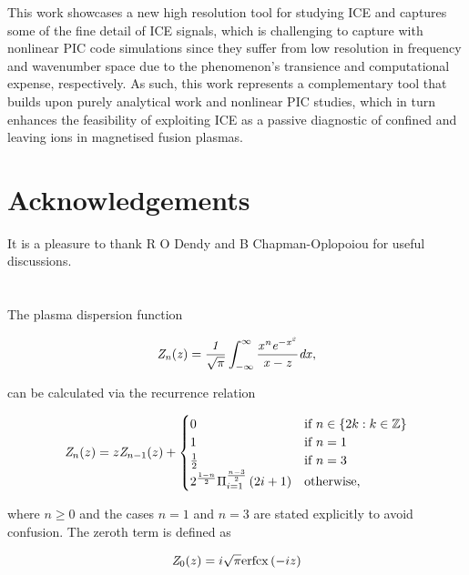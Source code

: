 \documentclass[12pt]{iopart}
\begin{document}
This work showcases a new high resolution tool for studying ICE and captures
some of the fine detail of ICE signals, which is challenging to capture
with nonlinear PIC
code simulations since they suffer from low resolution in frequency and
wavenumber space due to the phenomenon's transience and computational expense,
respectively. As such, this work represents a complementary tool that builds
upon purely analytical work and nonlinear PIC studies, which in turn enhances
the feasibility of exploiting ICE as a passive diagnostic of confined and
leaving ions in magnetised fusion plasmas.

\section{Acknowledgements}

It is a pleasure to thank R O Dendy and B Chapman-Oplopoiou for useful
discussions.

\appendix

\section{}

The plasma dispersion function\cite{Fried1961}

\begin{equation}
\it{Z}_n(z)=\frac{1}{\sqrt{\pi}}\int_{-\infty}^{\infty}\frac{x^n e^{-x^2}}{x-z}dx,
\end{equation}

\noindent can be calculated via the recurrence relation\cite{Sampoorna2007}

\begin{equation}
{\it Z}_n(z) = z {\it Z}_{n-1}(z) + \begin{cases}
0 & \text{if } n \in \{2k : k \in \mathbb{Z}\}
\\
1 & \text{if } n = 1
\\
\frac{1}{2} & \text{if } n = 3
\\
2^{\frac{1-n}{2}} \Pi_{i=1}^{\frac{n-3}{2}} \left( 2i + 1 \right) & \text{otherwise},
\end{cases}
\end{equation}

\noindent where $n \geq 0$ and the cases $n=1$ and $n=3$ are stated explicitly to avoid confusion. The zeroth term is defined as

\begin{equation}
 {\it Z}_0(z) = i \sqrt{\pi} \mathrm{erfcx} \left(-i z \right)
\end{equation}
\end{document}

